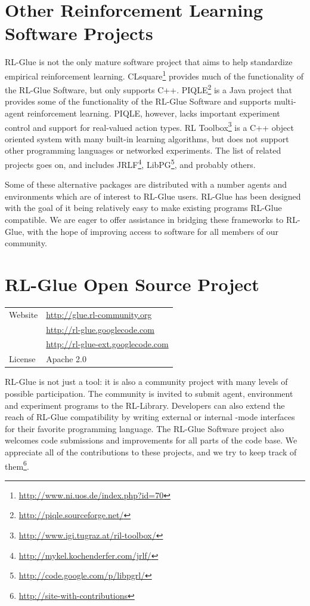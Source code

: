 \documentclass[twoside,11pt]{article}
\begin{document}
\section{Other Reinforcement Learning Software Projects}
RL-Glue is not the only mature software project that aims to help standardize empirical reinforcement learning. CLsquare\footnote{\url{http://www.ni.uos.de/index.php?id=70}} provides much of the functionality of the RL-Glue Software, but only supports C++.
PIQLE\footnote{\url{http://piqle.sourceforge.net/}} is a Java project that provides some of the functionality of the RL-Glue Software and supports multi-agent reinforcement learning. PIQLE, however, lacks important experiment control and support for real-valued action types. RL Toolbox\footnote{\url{http://www.igi.tugraz.at/ril-toolbox/}
} is a C++ object oriented system with many built-in learning algorithms, but does not support other programming languages or networked experiments.  The list of related projects goes on, and includes JRLF\footnote{\url{http://mykel.kochenderfer.com/jrlf/}}, LibPG\footnote{\url{http://code.google.com/p/libpgrl/}}, and probably others.

Some of these alternative packages are distributed with a number agents and environments which are of interest to RL-Glue users. RL-Glue has been designed with the goal of it being relatively easy to make existing programs RL-Glue compatible.  We are eager to offer assistance in bridging these frameworks to RL-Glue, with the hope of improving access to software for all members of our community.





 
 
 
\section{RL-Glue Open Source Project}
\begin{tabular}{ l l }
  Website &  \url{http://glue.rl-community.org} \\
    &  \url{http://rl-glue.googlecode.com} \\
    &  \url{http://rl-glue-ext.googlecode.com} \\
  License & Apache 2.0  \\
\end{tabular}
\newline
\newline
RL-Glue is not just a tool: it is also a community project with many levels of possible participation. The community is invited to submit agent, environment and experiment programs to the RL-Library. Developers can also extend the reach of RL-Glue compatibility by writing external or internal -mode interfaces for their favorite programming language.  The RL-Glue Software project also welcomes code submissions and improvements for all parts of the code base.  We appreciate all of the contributions to these projects, and we try to keep track of them\footnote{\url{http://site-with-contributions}}.
\end{document}
